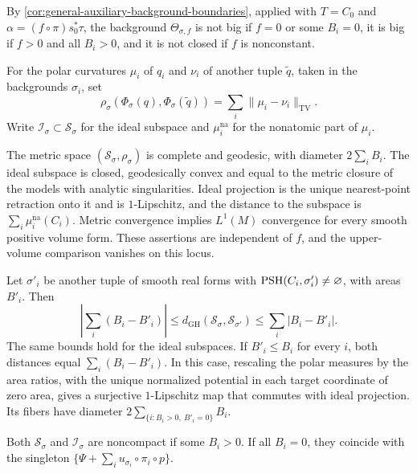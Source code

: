 By \cref{cor:general-auxiliary-background-boundaries}, applied with $T=C_0$ and $\alpha=(f\circ\pi)s_0^*\tau$, the background $\Theta_{\sigma,f}$ is not big if $f=0$ or some $B_i=0$, it is big if $f>0$ and all $B_i>0$, and it is not closed if $f$ is nonconstant.

For the polar curvatures $\mu_i$ of $q_i$ and $\nu_i$ of another tuple $\widetilde q$, taken in the backgrounds $\sigma_i$, set
\begin{equation}\label{eq:arbitrary-product-polar-metric}
 \rho_\sigma(\Phi_\sigma(q),\Phi_\sigma(\widetilde q))
       =\sum_i\|\mu_i-\nu_i\|_{\mathrm{TV}}.
\end{equation}
Write $\mathcal I_\sigma\subset\mathcal S_\sigma$ for the ideal subspace and $\mu_i^{\mathrm{na}}$ for the nonatomic part of $\mu_i$.

\begin{proposition}\label{prop:arbitrary-curve-product-metric}
The metric space $(\mathcal S_\sigma,\rho_\sigma)$ is complete and geodesic, with diameter $2\sum_i B_i$. The ideal subspace is closed, geodesically convex and equal to the metric closure of the models with analytic singularities. Ideal projection is the unique nearest-point retraction onto it and is $1$-Lipschitz, and the distance to the subspace is $\sum_i\mu_i^{\mathrm{na}}(C_i)$. Metric convergence implies $L^1(M)$ convergence for every smooth positive volume form. These assertions are independent of $f$, and the upper-volume comparison vanishes on this locus.

Let $\sigma'_i$ be another tuple of smooth real forms with $\mathrm{PSH}(C_i,\sigma'_i)\ne\varnothing$, with areas $B'_i$. Then
\begin{equation}\label{eq:arbitrary-product-area-comparison}
 \left|\sum_i(B_i-B'_i)\right|
 \leq d_{\mathrm{GH}}(\mathcal S_\sigma,\mathcal S_{\sigma'})
 \leq\sum_i|B_i-B'_i|.
\end{equation}
The same bounds hold for the ideal subspaces. If $B'_i\leq B_i$ for every $i$, both distances equal $\sum_i(B_i-B'_i)$. In this case, rescaling the polar measures by the area ratios, with the unique normalized potential in each target coordinate of zero area, gives a surjective $1$-Lipschitz map that commutes with ideal projection. Its fibers have diameter $2\sum_{\{i:B_i>0,\ B'_i=0\}}B_i$.

Both $\mathcal S_\sigma$ and $\mathcal I_\sigma$ are noncompact if some $B_i>0$. If all $B_i=0$, they coincide with the singleton $\{\Psi+\sum_i u_{\sigma_i}\circ\pi_i\circ p\}$.
\end{proposition}
